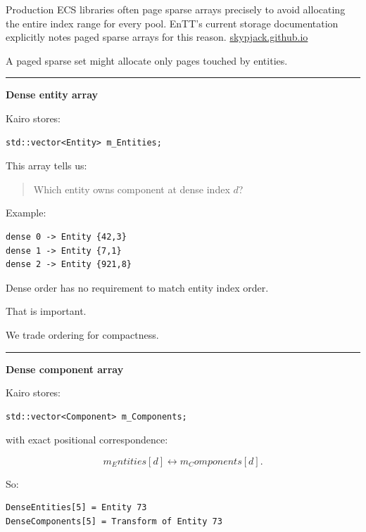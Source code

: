 Production ECS libraries often page sparse arrays precisely to avoid allocating the entire index range for every pool. EnTT's current storage documentation explicitly notes paged sparse arrays for this reason. \href{https://skypjack.github.io/entt/md_docs_2md_2entity.html?utm_source=chatgpt.com}{skypjack.github.io}

A paged sparse set might allocate only pages touched by entities.

\begin{center}\rule{0.5\linewidth}{0.5pt}\end{center}

\textbf{Dense entity array}

Kairo stores:

\begin{verbatim}
std::vector<Entity> m_Entities;
\end{verbatim}

This array tells us:

\begin{quote}
Which entity owns component at dense index \(d\)?
\end{quote}

Example:

\begin{verbatim}
dense 0 -> Entity {42,3}
dense 1 -> Entity {7,1}
dense 2 -> Entity {921,8}
\end{verbatim}

Dense order has no requirement to match entity index order.

That is important.

We trade ordering for compactness.

\begin{center}\rule{0.5\linewidth}{0.5pt}\end{center}

\textbf{Dense component array}

Kairo stores:

\begin{verbatim}
std::vector<Component> m_Components;
\end{verbatim}

with exact positional correspondence:

\[
m_Entities[d]
\leftrightarrow
m_Components[d].
\]

So:

\begin{verbatim}
DenseEntities[5] = Entity 73
DenseComponents[5] = Transform of Entity 73
\end{verbatim}

